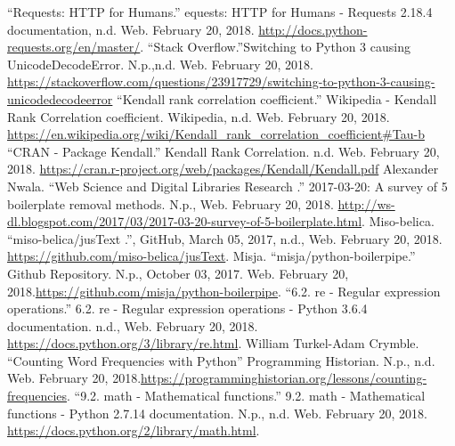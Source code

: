 \documentclass[letterpaper,11pt]{article}
\begin{document}
\begin{thebibliography}{9}
``Requests: HTTP for Humans.'' equests: HTTP for Humans - Requests 2.18.4 documentation, n.d. Web. February 20, 2018. \url{http://docs.python-requests.org/en/master/}.
``Stack Overflow.''Switching to Python 3 causing UnicodeDecodeError. N.p.,n.d. Web. February 20, 2018. \url{https://stackoverflow.com/questions/23917729/switching-to-python-3-causing-unicodedecodeerror}
``Kendall rank correlation coefficient.'' Wikipedia - Kendall Rank Correlation coefficient. Wikipedia, n.d. Web. February 20, 2018. \url{https://en.wikipedia.org/wiki/Kendall_rank_correlation_coefficient#Tau-b}
``CRAN - Package Kendall.''  Kendall Rank Correlation.  n.d. Web. February 20, 2018. \url{https://cran.r-project.org/web/packages/Kendall/Kendall.pdf}
Alexander Nwala. ``Web Science and Digital Libraries Research .'' 2017-03-20: A survey of 5 boilerplate removal methods. N.p., Web. February 20, 2018. \url{http://ws-dl.blogspot.com/2017/03/2017-03-20-survey-of-5-boilerplate.html}.
Miso-belica. ``miso-belica/jusText .'',  GitHub,  March 05, 2017, n.d., Web. February 20, 2018. \url{https://github.com/miso-belica/jusText}.
Misja. ``misja/python-boilerpipe.'' Github Repository. N.p., October 03, 2017. Web. February 20, 2018.\url{https://github.com/misja/python-boilerpipe}.
``6.2. re - Regular expression operations.'' 6.2. re - Regular expression operations - Python 3.6.4 documentation. n.d.,  Web. February 20, 2018. \url{https://docs.python.org/3/library/re.html}.
William Turkel-Adam Crymble. ``Counting Word Frequencies with Python'' Programming Historian. N.p., n.d. Web. February 20, 2018.\url{https://programminghistorian.org/lessons/counting-frequencies}.
``9.2. math - Mathematical functions.'' 9.2. math - Mathematical functions - Python 2.7.14 documentation. N.p., n.d. Web. February 20, 2018. \url{https://docs.python.org/2/library/math.html}.
\end{thebibliography}
\end{document}
